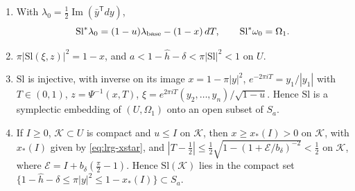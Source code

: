 \begin{lemma}
\begin{enumerate}[label=(\roman*)]
\item With $\lambda_0=\frac12\operatorname{Im}(\bar y^{\mathsf T}dy)$,
\[
 \mathrm{Sl}^*\lambda_0=(1-u)\lambda_{\rm base}-(1-x)\,dT,\qquad \mathrm{Sl}^*\omega_0=\Omega_1 .
\]
\item $\pi|\mathrm{Sl}(\xi,z)|^2=1-x$, and $a<1-\hat h-\delta<\pi|\mathrm{Sl}|^2<1$ on $U$.
\item $\mathrm{Sl}$ is injective, with inverse on its image $x=1-\pi|y|^2$, $e^{-2\pi iT}=y_1/|y_1|$ with $T\in(0,1)$,
$z=\Psi^{-1}(x,T)$, $\xi=e^{2\pi iT}(y_2,\dots,y_n)/\sqrt{1-u}$. Hence $\mathrm{Sl}$ is a symplectic embedding of $(U,\Omega_1)$ onto an open
subset of $S_a$.
\item If $I\ge0$, $\mathcal K\subset U$ is compact and $u\le I$ on $\mathcal K$, then $x\ge x_*(I)>0$ on $\mathcal K$, with $x_*(I)$ given by
\eqref{eq:lrg-xstar}, and $|T-\frac12|\le\frac12\sqrt{1-(1+\mathcal E/b_\delta)^{-2}}<\frac12$ on $\mathcal K$, where
$\mathcal E=I+b_\delta(\frac\pi2-1)$. Hence $\mathrm{Sl}(\mathcal K)$ lies in the compact set $\{1-\hat h-\delta\le\pi|y|^2\le1-x_*(I)\}\subset S_a$.
\end{enumerate}
\end{lemma}

